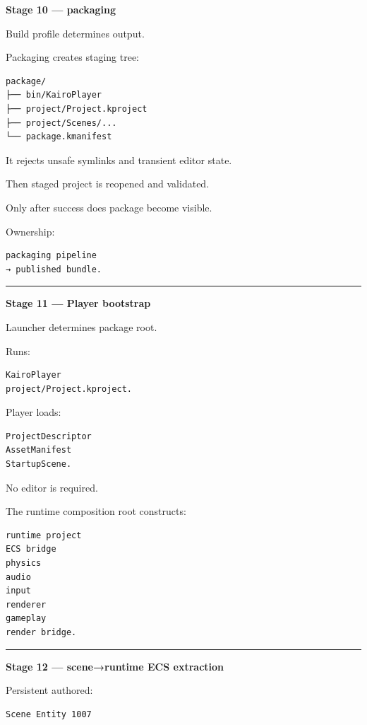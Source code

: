 \textbf{Stage 10 --- packaging}

Build profile determines output.

Packaging creates staging tree:

\begin{verbatim}
package/
├── bin/KairoPlayer
├── project/Project.kproject
├── project/Scenes/...
└── package.kmanifest
\end{verbatim}

It rejects unsafe symlinks and transient editor state.

Then staged project is reopened and validated.

Only after success does package become visible.

Ownership:

\begin{verbatim}
packaging pipeline
→ published bundle.
\end{verbatim}

\begin{center}\rule{0.5\linewidth}{0.5pt}\end{center}

\textbf{Stage 11 --- Player bootstrap}

Launcher determines package root.

Runs:

\begin{verbatim}
KairoPlayer
project/Project.kproject.
\end{verbatim}

Player loads:

\begin{verbatim}
ProjectDescriptor
AssetManifest
StartupScene.
\end{verbatim}

No editor is required.

The runtime composition root constructs:

\begin{verbatim}
runtime project
ECS bridge
physics
audio
input
renderer
gameplay
render bridge.
\end{verbatim}

\begin{center}\rule{0.5\linewidth}{0.5pt}\end{center}

\textbf{Stage 12 --- scene→runtime ECS extraction}

Persistent authored:

\begin{verbatim}
Scene Entity 1007
\end{verbatim}

